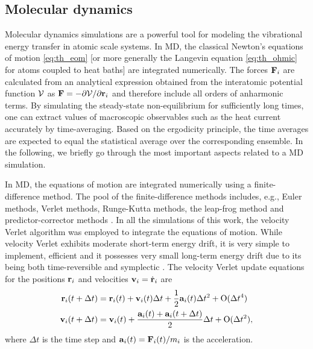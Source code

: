 \subsection{Molecular dynamics}


Molecular dynamics simulations are a powerful tool for modeling the vibrational energy transfer in atomic scale systems. In MD, the classical Newton's equations of motion \eqref{eq:th_eom} [or more generally the Langevin equation \eqref{eq:th_ohmic} for atoms coupled to heat baths] are integrated numerically. The forces $\mathbf{F}_i$ are calculated from an analytical expression obtained from the interatomic potential function $\mathcal{V}$ as $\mathbf{F}=-\partial \mathcal{V}/\partial \mathbf{r}_i$ and therefore include all orders of anharmonic terms. By simulating the steady-state non-equilibrium for sufficiently long times, one can extract values of macroscopic observables such as the heat current accurately by time-averaging. Based on the ergodicity principle, the time averages are expected to equal the statistical average over the corresponding ensemble. In the following, we briefly go through the most important aspects related to a MD simulation.




In MD, the equations of motion are integrated numerically using a finite-difference method. The pool of the finite-difference methods includes, e.g., Euler methods, Verlet methods, Runge-Kutta methods, the leap-frog method and predictor-corrector methods \cite{}. In all the simulations of this work, the velocity Verlet algorithm was employed to integrate the equations of motion. While velocity Verlet exhibits moderate short-term energy drift, it is very simple to implement, efficient and it possesses very small long-term energy drift due to its being both time-reversible and symplectic \cite{}. The velocity Verlet update equations for the positions $\mathbf{r}_i$ and velocities $\mathbf{v}_i=\dot{\mathbf{r}}_i$ are \cite{}
\begin{alignat}{2}
  \mathbf{r}_i(t+\Delta t) &= \mathbf{r}_i(t) + \mathbf{v}_i(t)\Delta t+  \frac{1}{2}\mathbf{a}_i(t) \Delta t^2 + \mathrm{O}(\Delta t^4) \\
  \mathbf{v}_i(t+\Delta t) &= \mathbf{v}_i(t) + \frac{ \mathbf{a}_i(t)+\mathbf{a}_i(t+\Delta t)}{2} \Delta t+ \mathrm{O}(\Delta t^2) ,
\end{alignat}
where $\Delta t$ is the time step and $\mathbf{a}_i(t)=\mathbf{F}_i(t)/m_i$ is the acceleration.


